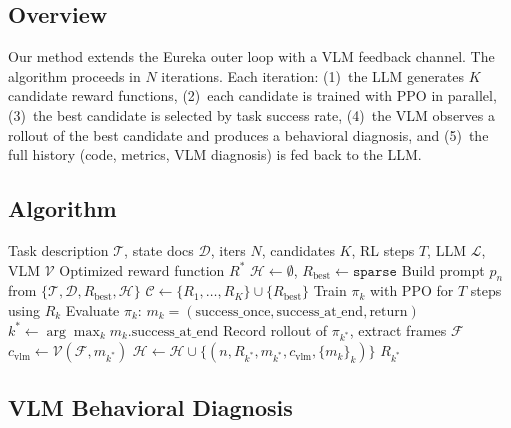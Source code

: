 \documentclass[conference]{IEEEtran}
\begin{document}
\subsection{Overview}

Our method extends the Eureka outer loop with a VLM feedback channel. The
algorithm proceeds in $N$ iterations. Each iteration: (1)~the LLM generates $K$
candidate reward functions, (2)~each candidate is trained with PPO in parallel,
(3)~the best candidate is selected by task success rate, (4)~the VLM observes
a rollout of the best candidate and produces a behavioral diagnosis, and (5)~the
full history (code, metrics, VLM diagnosis) is fed back to the LLM.

\subsection{Algorithm}

\begin{algorithm}[t]
\caption{VLM-in-the-Loop Reward Generation}
\label{alg:vlm_loop}
\begin{algorithmic}[1]
\REQUIRE Task description $\mathcal{T}$, state docs $\mathcal{D}$, iters $N$, candidates $K$, RL steps $T$, LLM $\mathcal{L}$, VLM $\mathcal{V}$
\ENSURE Optimized reward function $R^*$
\STATE $\mathcal{H} \leftarrow \emptyset$, $R_{\text{best}} \leftarrow \texttt{sparse}$
    \STATE Build prompt $p_n$ from $\{\mathcal{T}, \mathcal{D}, R_{\text{best}}, \mathcal{H}\}$
    \STATE $\mathcal{C} \leftarrow \{R_1, \ldots, R_K\} \cup \{R_{\text{best}}\}$
        \STATE Train $\pi_k$ with PPO for $T$ steps using $R_k$
        \STATE Evaluate $\pi_k$: $m_k = (\text{success\_once}, \text{success\_at\_end}, \text{return})$
    \ENDFOR
    \STATE $k^* \leftarrow \arg\max_k m_k.\text{success\_at\_end}$
    \STATE Record rollout of $\pi_{k^*}$, extract frames $\mathcal{F}$
    \STATE $c_{\text{vlm}} \leftarrow \mathcal{V}(\mathcal{F}, m_{k^*})$
    \STATE $\mathcal{H} \leftarrow \mathcal{H} \cup \{(n, R_{k^*}, m_{k^*}, c_{\text{vlm}}, \{m_k\}_k)\}$
\ENDFOR
\RETURN $R_{k^*}$
\end{algorithmic}
\end{algorithm}

\subsection{VLM Behavioral Diagnosis}
\end{document}
